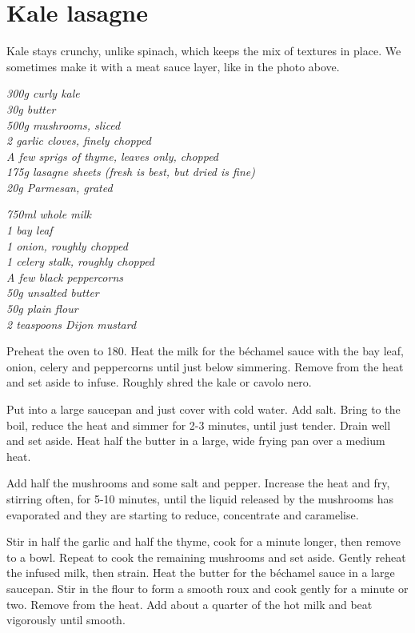 \documentclass{tufte-book}
\begin{document}
\section{Kale lasagne}

Kale stays crunchy, unlike spinach, which keeps the mix of textures in place. We sometimes make it with a meat sauce layer, like in the photo above.


\emph{300g curly kale
\\30g butter
\\500g mushrooms, sliced
\\2 garlic cloves, finely chopped
\\A few sprigs of thyme, leaves only, chopped
\\175g lasagne sheets (fresh is best, but dried is fine)
\\20g Parmesan, grated
}

\newpage


\emph{750ml whole milk
\\1 bay leaf
\\1 onion, roughly chopped
\\1 celery stalk, roughly chopped
\\A few black peppercorns
\\50g unsalted butter
\\50g plain flour
\\2 teaspoons Dijon mustard
}

\smallskip
Preheat the oven to 180\celsius. Heat the milk for the béchamel sauce with the bay leaf, onion, celery and peppercorns until just below simmering. Remove from the heat and set aside to infuse. Roughly shred the kale or cavolo nero.

Put into a large saucepan and just cover with cold water. Add salt. Bring to the boil, reduce the heat and simmer for 2-3 minutes, until just tender. Drain well and set aside. Heat half the butter in a large, wide frying pan over a medium heat.

Add half the mushrooms and some salt and pepper. Increase the heat and fry, stirring often, for 5-10 minutes, until the liquid released by the mushrooms has evaporated and they are starting to reduce, concentrate and caramelise.

Stir in half the garlic and half the thyme, cook for a minute longer, then remove to a bowl. Repeat to cook the remaining mushrooms and set aside. Gently reheat the infused milk, then strain. Heat the butter for the b\'echamel sauce in a large saucepan. Stir in the flour to form a smooth roux and cook gently for a minute or two. Remove from the heat. Add about a quarter of the hot milk and beat vigorously until smooth.
\end{document}
